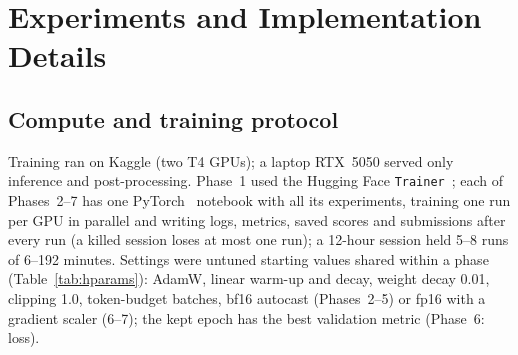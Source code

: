 \documentclass[11pt, oneside]{article}
\begin{document}
\section{Experiments and Implementation Details}
\subsection{Compute and training protocol}
Training ran on Kaggle (two T4 GPUs); a laptop RTX~5050 served only inference and post-processing. Phase~1 used the
Hugging Face \texttt{Trainer}~\cite{hf}; each of Phases~2--7 has one PyTorch~\cite{pytorch} notebook with all its
experiments, training one run per GPU in parallel and writing logs, metrics, saved scores and submissions after every
run (a killed session loses at most one run); a 12-hour session held 5--8 runs of 6--192 minutes. Settings were
untuned starting values shared within a phase (Table~\ref{tab:hparams}): AdamW, linear warm-up and decay, weight decay
0.01, clipping 1.0, token-budget batches, bf16 autocast (Phases~2--5) or fp16 with a gradient scaler (6--7); the kept
epoch has the best validation metric (Phase~6: loss).
\end{document}
